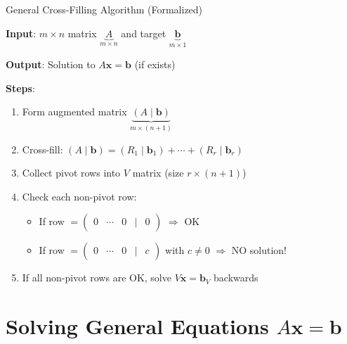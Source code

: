 \documentclass[10pt]{beamer}
\theoremstyle{definition}
\newcommand{\x}[1]{\alert{\textbf{#1}}}
\begin{document}
\begin{frame}{General Cross-Filling Algorithm (Formalized)}

\x{Input}: $m \times n$ matrix $\underbrace{A}_{m \times n}$ and target $\underbrace{\mathbf{b}}_{m \times 1}$

\x{Output}: Solution to $A\mathbf{x} = \mathbf{b}$ (if exists)

\vspace{1em}

\x{Steps}:
\begin{enumerate}
\item Form augmented matrix $\underbrace{(A \mid \mathbf{b})}_{m \times (n+1)}$
\item Cross-fill: $(A \mid \mathbf{b}) = (R_1 \mid \mathbf{b}_1) + \cdots + (R_r \mid \mathbf{b}_r)$
\item Collect pivot rows into $V$ matrix (size $r \times (n+1)$)
\item Check each non-pivot row:
   \begin{itemize}
   \item If row $= \begin{pmatrix} 0 & \cdots & 0 & \mid & 0 \end{pmatrix}$ $\Rightarrow$ OK
   \item If row $= \begin{pmatrix} 0 & \cdots & 0 & \mid & c \end{pmatrix}$ with $c \neq 0$ $\Rightarrow$ NO solution!
   \end{itemize}
\item If all non-pivot rows are OK, solve $V\mathbf{x} = \mathbf{b}_V$ backwards
\end{enumerate}

\end{frame}

\section{Solving General Equations $A\mathbf{x} = \mathbf{b}$}
\end{document}
